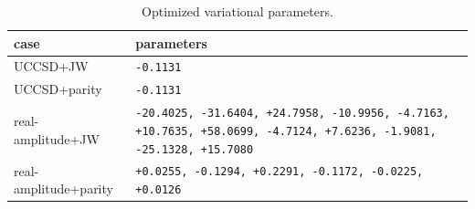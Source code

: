 \begin{table}[H]
\centering\small
\begin{tabular}{l>{\raggedright\arraybackslash}p{10.5cm}}
\toprule
case & parameters \\
\midrule
UCCSD+JW & \texttt{-0.1131} \\
UCCSD+parity & \texttt{-0.1131} \\
real-amplitude+JW & \texttt{-20.4025, -31.6404, +24.7958, -10.9956, -4.7163, +10.7635, +58.0699, -4.7124, +7.6236, -1.9081, -25.1328, +15.7080} \\
real-amplitude+parity & \texttt{+0.0255, -0.1294, +0.2291, -0.1172, -0.0225, +0.0126} \\
\bottomrule
\end{tabular}
\caption{Optimized variational parameters.}
\end{table}

